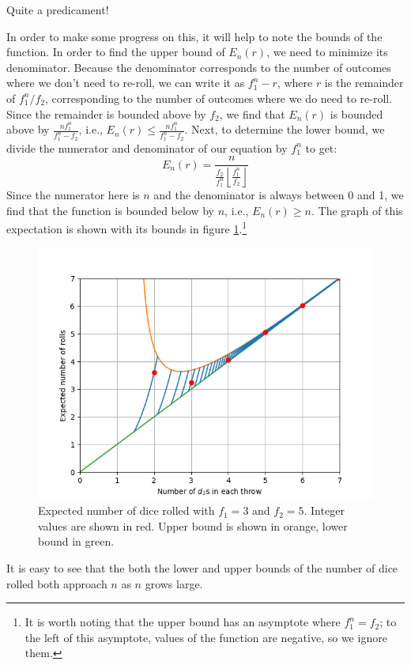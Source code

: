 \documentclass{article}
\begin{document}
Quite a predicament!
\par In order to make some progress on this, it will help to note the bounds of the function.
In order to find the upper bound of $E_n(r)$, we need to minimize its denominator.
Because the denominator corresponds to the number of outcomes where we don't need to re-roll, we can write it as $f_1^n - r$, where $r$ is the remainder of $f_1^n / f_2$, corresponding to the number of outcomes where we do need to re-roll.
Since the remainder is bounded above by $f_2$, we find that $E_n(r)$ is bounded above by $\frac{nf_1^n}{f_1^n-f_2}$, i.e., $E_n(r) \le \frac{nf_1^n}{f_1^n-f_2}$.
Next, to determine the lower bound, we divide the numerator and denominator of our equation by $f_1^n$ to get: $$E_n(r) = \frac{n}{\frac{f_2}{f_1^n} \left \lfloor \frac{f_1^n}{f_2} \right \rfloor}$$
Since the numerator here is $n$ and the denominator is always between 0 and 1, we find that the function is bounded below by $n$, i.e., $E_n(r) \ge n$.
The graph of this expectation is shown with its bounds in figure \ref{fig:num-rolls-with-bounds}.\footnote{It is worth noting that the upper bound has an asymptote where $f_1^n=f_2$; to the left of this asymptote, values of the function are negative, so we ignore them.}
\begin{figure}
    \centering
    \includegraphics[scale=0.5]{num-rolls-with-bounds.png}
    \caption{Expected number of dice rolled with $f_1=3$ and $f_2=5$. Integer values are shown in red. Upper bound is shown in orange, lower bound in green.}
    \label{fig:num-rolls-with-bounds}
\end{figure}
\par It is easy to see that the both the lower and upper bounds of the number of dice rolled both approach $n$ as $n$ grows large.
\end{document}
